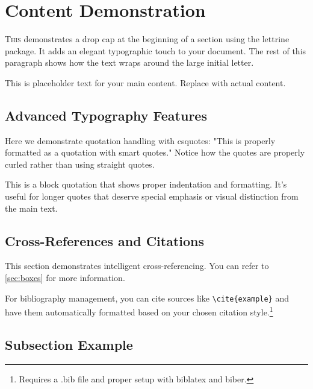 \documentclass[a4paper,11pt]{article}
\begin{document}
\newpage

\tableofcontents
\newpage


\section{Content Demonstration}

\lettrine[lines=3, loversize=0.1]{T}{his} demonstrates a drop cap at the beginning of a section using the lettrine package. It adds an elegant typographic touch to your document. The rest of this paragraph shows how the text wraps around the large initial letter.

This is placeholder text for your main content. Replace with actual content.

\subsection{Advanced Typography Features}

Here we demonstrate quotation handling with csquotes: "This is properly formatted as a quotation with smart quotes." Notice how the quotes are properly curled rather than using straight quotes.

\begin{displayquote}
This is a block quotation that shows proper indentation and formatting. It's useful for longer quotes that deserve special emphasis or visual distinction from the main text.
\end{displayquote}

\subsection{Cross-References and Citations}

This section demonstrates intelligent cross-referencing. You can refer to \vref{sec:boxes} for more information.

For bibliography management, you can cite sources like \texttt{\textbackslash cite\{example\}} and have them automatically formatted based on your chosen citation style.\footnote{Requires a .bib file and proper setup with biblatex and biber.}

\subsection{Subsection Example}
\end{document}
